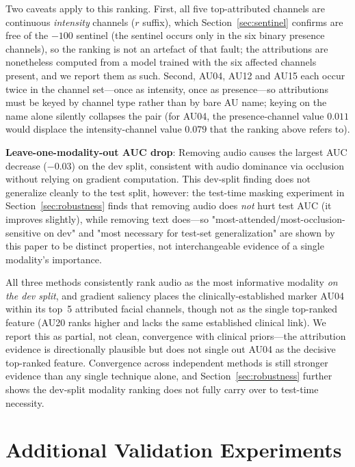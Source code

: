 \documentclass[journal]{IEEEtran}
\begin{document}
Two caveats apply to this ranking. First, all five top-attributed
channels are continuous \emph{intensity} channels ($r$ suffix), which
Section~\ref{sec:sentinel} confirms are free of the $-100$ sentinel
(the sentinel occurs only in the six binary presence channels), so the
ranking is not an artefact of that fault; the attributions are
nonetheless computed from a model trained with the six affected
channels present, and we report them as such. Second, AU04, AU12 and
AU15 each occur twice in the channel set---once as intensity, once as
presence---so attributions must be keyed by channel type rather than by
bare AU name; keying on the name alone silently collapses the pair
(for AU04, the presence-channel value $0.011$ would displace the
intensity-channel value $0.079$ that the ranking above refers to).

\textbf{Leave-one-modality-out AUC drop}: Removing audio causes the
largest AUC decrease ($-0.03$) on the dev split, consistent with
audio dominance via occlusion without relying on gradient computation.
This dev-split finding does not generalize cleanly to the test split,
however: the test-time masking experiment in
Section~\ref{sec:robustness} finds that removing audio does
\emph{not} hurt test AUC (it improves slightly), while removing text
does---so "most-attended/most-occlusion-sensitive on dev" and
"most necessary for test-set generalization" are shown by this paper
to be distinct properties, not interchangeable evidence of a single
modality's importance.

All three methods consistently rank audio as the most informative
modality \emph{on the dev split}, and gradient saliency places the
clinically-established marker AU04 within its top~5 attributed facial
channels, though not as the single top-ranked feature (AU20 ranks
higher and lacks the same established clinical link). We report this
as partial, not clean, convergence with clinical priors---the
attribution evidence is directionally plausible but does not single
out AU04 as the decisive top-ranked feature. Convergence
across independent methods is still stronger evidence than any single
technique alone, and Section~\ref{sec:robustness} further shows the
dev-split modality ranking does not fully carry over to test-time
necessity.

\section{Additional Validation Experiments}
\label{sec:additional_validation}
\end{document}
